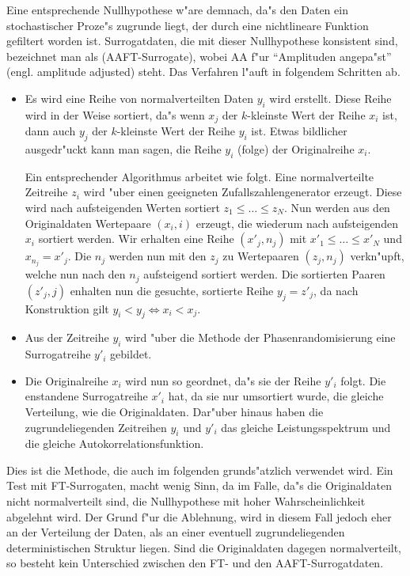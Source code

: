 Eine entsprechende Nullhypothese w"are demnach, da"s den Daten ein stochastischer Proze"s
zugrunde liegt, der durch eine nichtlineare Funktion gefiltert worden ist. Surrogatdaten, die
mit dieser Nullhypothese konsistent sind, bezeichnet man als \begriff(AAFT-Surrogate),
wobei AA f"ur ``Amplituden angepa"st'' (engl. amplitude adjusted) steht.  
Das Verfahren l"auft in  folgendem Schritten ab.
\begin{itemize}
\item Es wird eine Reihe von normalverteilten Daten $y_i$ wird erstellt. Diese Reihe wird
  in der Weise  sortiert, da"s wenn $x_j$ der $k$-kleinste Wert der Reihe $x_i$ ist, dann
  auch $y_j$ der $k$-kleinste Wert der Reihe $y_i$ ist. Etwas bildlicher ausgedr"uckt
  kann man sagen, die Reihe $y_i$ \naja(folge) der Originalreihe $x_i$.
  
  Ein entsprechender Algorithmus arbeitet wie folgt.  Eine normalverteilte Zeitreihe $z_i$
  wird "uber einen geeigneten Zufallszahlengenerator erzeugt. Diese wird nach
  aufsteigenden Werten sortiert $z_1\leq\dots\leq z_N$.  Nun werden aus den Originaldaten
  Wertepaare $(x_i,i)$ erzeugt, die wiederum nach aufsteigenden $x_i$ sortiert werden. Wir
  erhalten eine Reihe $(x'_j,n_j)$ mit $x'_1\leq\dots\leq x'_N$ und $x_{n_j}=x'_j$. Die
  $n_j$ werden nun mit den $z_j$ zu Wertepaaren $(z_j,n_j)$ verkn"upft, welche nun nach
  den $n_j$ aufsteigend sortiert werden. Die sortierten Paaren $(z'_j,j)$ enhalten nun die
  gesuchte, sortierte Reihe $y_j=z'_j$, da nach Konstruktion gilt $y_i<y_j\Leftrightarrow
  x_i<x_j$.
\item Aus der Zeitreihe $y_i$ wird "uber die Methode der Phasenrandomisierung eine
  Surrogatreihe $y'_i$ gebildet. 
\item Die Originalreihe $x_i$ wird nun so geordnet, da"s sie der Reihe $y'_i$ folgt. Die
  enstandene Surrogatreihe $x'_i$ hat, da sie nur umsortiert wurde, die gleiche
  Verteilung, wie die Originaldaten. Dar"uber hinaus haben die zugrundeliegenden
  Zeitreihen $y_i$ und $y'_i$ das gleiche Leistungsspektrum und die gleiche Autokorrelationsfunktion.
\end{itemize}
Dies ist die Methode, die auch im folgenden grunds"atzlich verwendet wird. Ein Test mit
FT-Surrogaten, macht wenig Sinn, da im Falle, da"s die Originaldaten nicht normalverteilt
sind, die Nullhypothese mit hoher Wahrscheinlichkeit abgelehnt wird. Der Grund f"ur die
Ablehnung, wird in diesem Fall jedoch eher an der Verteilung der Daten, als an einer 
eventuell zugrundeliegenden deterministischen Struktur liegen. Sind die Originaldaten dagegen
normalverteilt, so besteht kein Unterschied zwischen den FT- und den AAFT-Surrogatdaten.



